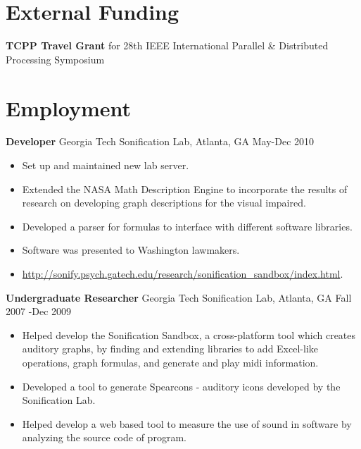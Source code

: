 \documentclass{res}
\begin{document}
\begin{resume}
\section{External Funding}
\textbf{TCPP Travel Grant} for 28th IEEE International Parallel \& Distributed Processing Symposium




\section{Employment}
% 
{\bf Developer} Georgia Tech Sonification Lab, Atlanta, GA May-Dec 2010
	\begin{itemize}
		\item Set up and maintained new lab server.
		\item Extended the NASA Math Description Engine to incorporate the results of research on developing graph descriptions for the visual impaired.
		\item Developed a parser for formulas to interface with different software libraries.
		\item Software was presented to Washington lawmakers.
		\item \url{http://sonify.psych.gatech.edu/research/sonification_sandbox/index.html}.
    \end{itemize}      
    
{\bf Undergraduate Researcher} Georgia Tech Sonification Lab, Atlanta, GA Fall 2007 -Dec 2009
	\begin{itemize}
		\item Helped develop the Sonification Sandbox, a cross-platform tool which creates auditory graphs, by finding and extending libraries to add Excel-like operations, graph formulas, and generate and play midi information.
		\item Developed a tool to generate Spearcons - auditory icons developed by the Sonification Lab.
		\item Helped develop a web based tool to measure the use of sound in software by analyzing the source code of program.
    \end{itemize}      
    


\end{resume}
\end{document}
